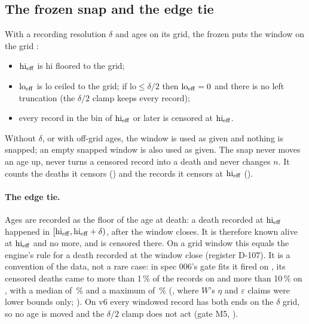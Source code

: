 \subsection{The frozen snap and the edge tie}\label{sec:win-snap}

With a recording resolution $\delta$ and ages on its grid, the frozen  puts the window on the grid
:
\begin{itemize}[nosep]
  \item $\mathrm{hi}_{\rm eff}$ is hi floored to the grid;
  \item $\mathrm{lo}_{\rm eff}$ is lo ceiled to the grid; if $\mathrm{lo}\le\delta/2$ then $\mathrm{lo}_{\rm eff}=0$ and
    there is no left truncation (the $\delta/2$ clamp keeps every record);
  \item every record in the bin of $\mathrm{hi}_{\rm eff}$ or later is censored at $\mathrm{hi}_{\rm eff}$.
\end{itemize}
Without $\delta$, or with off-grid ages, the window is used as given and nothing is snapped; an empty snapped window is
also used as given. The snap never moves an age up, never turns a censored record into a death and never changes $n$.
It counts the deaths it censors () and the records it censors at $\mathrm{hi}_{\rm eff}$
().

\paragraph{The edge tie.} Ages are recorded as the floor of the age at death: a death recorded at $\mathrm{hi}_{\rm eff}$
happened in $[\mathrm{hi}_{\rm eff},\mathrm{hi}_{\rm eff}+\delta)$, after the window closes. It is therefore known alive at
$\mathrm{hi}_{\rm eff}$ and no more, and is censored there. On a grid window this equals the engine's rule for a death
recorded at the window close (register D-107). It is a convention of the data, not a rare case: in spec 006's
 gate fits it fired on , its censored deaths came to more than 1\,\% of the records on  and more than
10\,\% on , with a median of \,\% and a maximum of \,\% (, where $W$'s $\eta$ and
$\varepsilon$ claims were lower bounds only; ). On v6 every windowed record
has both ends on the $\delta$ grid, so no age is moved and the $\delta/2$ clamp does not act (gate M5,
).

